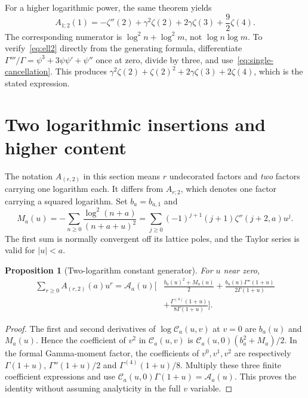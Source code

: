\documentclass[11pt,oneside]{article}
\numberwithin{equation}{section}
\newtheorem{proposition}[theorem]{Proposition}
\theoremstyle{definition}
\theoremstyle{remark}
\newcommand{\CC}{\mathcal C}
\newcommand{\Acal}{\mathcal A}
\begin{document}
For a higher logarithmic power, the same theorem yields
\begin{equation}\label{eq:ell2}
A_{1;2}(1)=-\zeta''(2)+\gamma^2\zeta(2)+2\gamma\zeta(3)
                    +\frac92\zeta(4).
\end{equation}
The corresponding numerator is $\log^2 n+\log^2 m$, not
$\log n\log m$. To verify~\eqref{eq:ell2} directly from the generating
formula, differentiate
$\Gamma'''/\Gamma=\psi^3+3\psi\psi'+\psi''$ once at zero, divide by three,
and use~\eqref{eq:single-cancellation}. This produces
$\gamma^2\zeta(2)+\zeta(2)^2+2\gamma\zeta(3)+2\zeta(4)$,
which is the stated expression.

\section{Two logarithmic insertions and higher content}
\label{sec:two}

The notation $A_{(r,2)}$ in this section means $r$ undecorated factors and
\emph{two} factors carrying one logarithm each. It differs from
$A_{r;2}$, which denotes one factor carrying a squared logarithm.
Set $b_a=b_{a,1}$ and
\begin{equation}\label{eq:M}
M_a(u)=-\sum_{n\ge0}\frac{\log^2(n+a)}{(n+a+u)^2}
=\sum_{j\ge0}(-1)^{j+1}(j+1)\zeta''(j+2,a)u^j.
\end{equation}
The first sum is normally convergent off its lattice poles, and the Taylor
series is valid for $|u|<a$.

\begin{proposition}[Two-logarithm constant generator]\label{prop:two}
For $u$ near zero,
\begin{equation}\label{eq:two-generator}
\begin{split}
\sum_{r\ge0}A_{(r,2)}(a)u^r
=\Acal_a(u)\biggl[&\frac{b_a(u)^2+M_a(u)}2
 +\frac{b_a(u)\Gamma''(1+u)}{2\Gamma(1+u)}\\
 &+\frac{\Gamma^{(4)}(1+u)}{8\Gamma(1+u)}\biggr].
\end{split}
\end{equation}
\end{proposition}

\begin{proof}
The first and second derivatives of $\log\CC_a(u,v)$ at $v=0$ are
$b_a(u)$ and $M_a(u)$. Hence the coefficient of $v^2$ in $\CC_a(u,v)$ is
$\CC_a(u,0)(b_a^2+M_a)/2$. In the formal Gamma-moment factor, the
coefficients of $v^0,v^1,v^2$ are respectively
$\Gamma(1+u)$, $\Gamma''(1+u)/2$ and $\Gamma^{(4)}(1+u)/8$.
Multiply these three finite coefficient expressions and use
$\CC_a(u,0)\Gamma(1+u)=\Acal_a(u)$. This proves the identity without assuming
analyticity in the full $v$ variable.
\end{proof}
\end{document}
